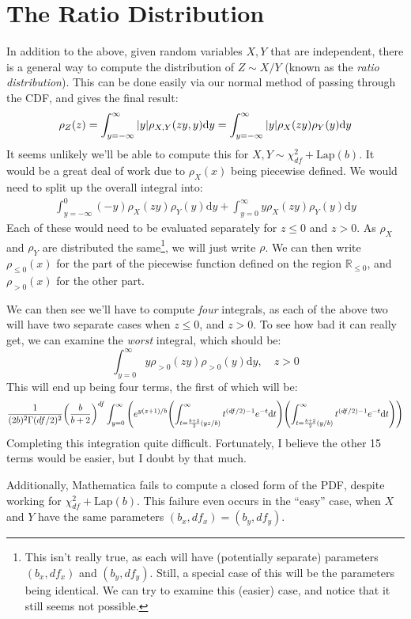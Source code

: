 \documentclass{article}
\begin{document}
\section{The Ratio Distribution}
In addition to the above, given random variables $X,Y$ that are independent, there is a general way to compute the distribution of $Z\sim X/Y$ (known as the \emph{ratio distribution}).
This can be done easily via our normal method of passing through the CDF, and gives the final result:
\begin{equation}
\rho_Z(z) = \int_{y = -\infty}^\infty\abs{y} \rho_{X,Y}(zy,y)\mathrm{ d}y = \int_{y = -\infty}^\infty \abs{y}\rho_X(zy)\rho_Y(y)\mathrm{ d}y
\end{equation}
It seems unlikely we'll be able to compute this for $X,Y\sim\chi^2_{df} + \text{Lap}(b)$.
It would be a great deal of work due to $\rho_X(x)$ being piecewise defined.
We would need to split up the overall integral into:
\begin{align*}
\int_{y =-\infty}^0 (-y)\rho_X(zy)\rho_Y(y)\mathrm{d}y + \int_{y =0}^\infty y\rho_X(zy)\rho_Y(y)\mathrm{d}y
\end{align*}
Each of these would need to be evaluated separately for $z \leq 0$ and $z > 0$.
As $\rho_X$ and $\rho_Y$ are distributed the same\footnote{This isn't really true, as each will have (potentially separate) parameters $(b_x,df_x)$ and $(b_y,df_y)$.
Still, a special case of this will be the parameters being identical.
We can try to examine this (easier) case, and notice that it still seems not possible.}, we will just write $\rho$.
We can then write $\rho_{\leq 0}(x)$ for the part of the piecewise function defined on the region $\mathbb{R}_{\leq 0}$, and $\rho_{>0}(x)$ for the other part.

We can then see we'll have to compute \emph{four} integrals, as each of the above two will have two separate cases when $z \leq 0$, and $z > 0$.
To see how bad it can really get, we can examine the \emph{worst} integral, which should be:
\begin{equation}
\int_{y = 0}^\infty y\rho_{>0}(zy)\rho_{>0}(y)\mathrm{d}y,\quad z > 0
\end{equation}
This will end up being four terms, the first of which will be:
\begin{equation}
\frac{1}{(2b)^2\Gamma(df/2)^2}\pqty{\frac{b}{b+2}}^{df}\int_{y = 0}^\infty\pqty{e^{y(z+1)/b}\pqty{\int_{t = \frac{b+2}{2}(yz/b)}^{\infty}t^{(df/2)-1}e^{-t}\mathrm{d}t}\pqty{\int_{t = \frac{b+2}{2}(y/b)}^{\infty}t^{(df/2)-1}e^{-t}\mathrm{d}t}}
\end{equation}
Completing this integration quite difficult.
Fortunately, I believe the other 15 terms would be easier, but I doubt by that much.

Additionally, Mathematica fails to compute a closed form of the PDF, despite working for $\chi^2_{df}+\text{Lap}(b)$.
This failure even occurs in the ``easy'' case, when $X$ and $Y$ have the same parameters $(b_x,df_x) = (b_y,df_y)$.
\end{document}
